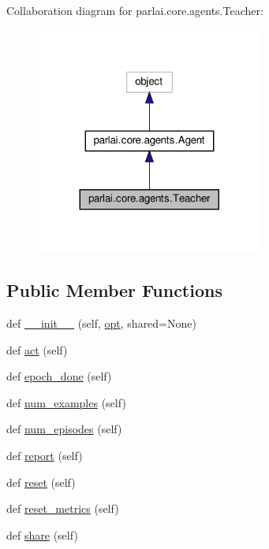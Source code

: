 Collaboration diagram for parlai.\+core.\+agents.\+Teacher\+:
\nopagebreak
\begin{figure}[H]
\begin{center}
\leavevmode
\includegraphics[width=212pt]{classparlai_1_1core_1_1agents_1_1Teacher__coll__graph}
\end{center}
\end{figure}
\subsection*{Public Member Functions}
\begin{DoxyCompactItemize}
\item 
def \hyperlink{classparlai_1_1core_1_1agents_1_1Teacher_ab15a6b5c801681b96bcb9725df0c7c7d}{\+\_\+\+\_\+init\+\_\+\+\_\+} (self, \hyperlink{classparlai_1_1core_1_1agents_1_1Teacher_a3ce6243860ce978a897922863ed32fa4}{opt}, shared=None)
\item 
def \hyperlink{classparlai_1_1core_1_1agents_1_1Teacher_a3f4cbdfdddddb8776ab665f5f7ee63d6}{act} (self)
\item 
def \hyperlink{classparlai_1_1core_1_1agents_1_1Teacher_a4a2eda53b7b26f114ae3149b60f57845}{epoch\+\_\+done} (self)
\item 
def \hyperlink{classparlai_1_1core_1_1agents_1_1Teacher_a93370e4e99236e8ad267b40cd4437920}{num\+\_\+examples} (self)
\item 
def \hyperlink{classparlai_1_1core_1_1agents_1_1Teacher_aa35e171610f8dd8e6a2fd5a87ad91e10}{num\+\_\+episodes} (self)
\item 
def \hyperlink{classparlai_1_1core_1_1agents_1_1Teacher_aa0afab11fb5f3f26ac59576f064623a4}{report} (self)
\item 
def \hyperlink{classparlai_1_1core_1_1agents_1_1Teacher_a3b1fe4cf4ea53c9b2ce28435391ad081}{reset} (self)
\item 
def \hyperlink{classparlai_1_1core_1_1agents_1_1Teacher_a3f14618f0f49c57a6fbcb4f80f8a1de4}{reset\+\_\+metrics} (self)
\item 
def \hyperlink{classparlai_1_1core_1_1agents_1_1Teacher_a43cf8d0b49ef4ff150ceef0149c063c3}{share} (self)
\end{DoxyCompactItemize}
